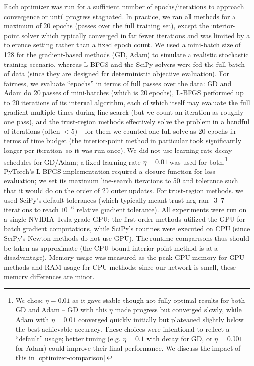 \documentclass[12pt]{article}
\begin{document}
Each optimizer was run for a sufficient number of epochs/iterations to approach convergence or until progress stagnated. In practice, we ran all methods for a maximum of 20 epochs (passes over the full training set), except the interior-point solver which typically converged in far fewer iterations and was limited by a tolerance setting rather than a fixed epoch count. We used a mini-batch size of 128 for the gradient-based methods (GD, Adam) to simulate a realistic stochastic training scenario, whereas L-BFGS and the SciPy solvers were fed the full batch of data (since they are designed for deterministic objective evaluation). For fairness, we evaluate “epochs” in terms of full passes over the data: GD and Adam do 20 passes of mini-batches (which is 20 epochs), L-BFGS performed up to 20 iterations of its internal algorithm, each of which itself may evaluate the full gradient multiple times during line search (but we count an iteration as roughly one pass), and the trust-region methods effectively solve the problem in a handful of iterations (often $<5$) – for them we counted one full solve as 20 epochs in terms of time budget (the interior-point method in particular took significantly longer per iteration, so it was run once). We did not use learning rate decay schedules for GD/Adam; a fixed learning rate $\eta=0.01$ was used for both.\footnote{We chose $\eta=0.01$ as it gave stable though not fully optimal results for both GD and Adam – GD with this $\eta$ made progress but converged slowly, while Adam with $\eta=0.01$ converged quickly initially but plateaued slightly below the best achievable accuracy. These choices were intentional to reflect a “default” usage; better tuning (e.g. $\eta=0.1$ with decay for GD, or $\eta=0.001$ for Adam) could improve their final performance. We discuss the impact of this in \cref{optimizer-comparison}.} PyTorch’s L-BFGS implementation required a closure function for loss evaluation; we set its maximum line-search iterations to 50 and tolerance such that it would do on the order of 20 outer updates. For trust-region methods, we used SciPy’s default tolerances (which typically meant trust-ncg ran ~3–7 iterations to reach $10^{-6}$ relative gradient tolerance). All experiments were run on a single NVIDIA Tesla-grade GPU; the first-order methods utilized the GPU for batch gradient computations, while SciPy’s routines were executed on CPU (since SciPy’s Newton methods do not use GPU). The runtime comparisons thus should be taken as approximate (the CPU-bound interior-point method is at a disadvantage). Memory usage was measured as the peak GPU memory for GPU methods and RAM usage for CPU methods; since our network is small, these memory differences are minor.
\end{document}

